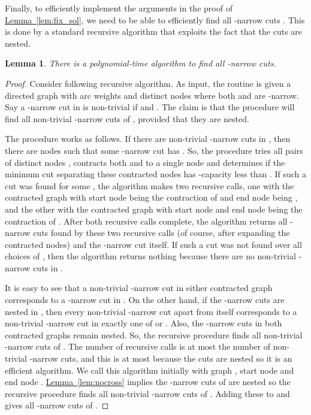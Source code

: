 \documentclass[11pt]{article}
\newcommand{\lref}[2][]{\hyperref[#2]{#1~\ref*{#2}}}
\newtheorem{lemma}[theorem]{Lemma}
\theoremstyle{definition}
\begin{document}
Finally, to efficiently implement the arguments in the proof of \lref[Lemma]{lem:fix_sol}, we need to be able to efficiently find
all -narrow cuts .
This is done by a standard recursive algorithm that exploits the fact that the cuts are nested.
\begin{lemma} \label{lem:efficient}
There is a polynomial-time algorithm to find all -narrow  cuts.
\end{lemma}
\begin{proof}
Consider following recursive algorithm.
As input, the routine is given a directed graph  with arc weights 
and distinct nodes   where both  and  are -narrow.
Say a -narrow cut  in  is non-trivial if  and .
The claim is that the procedure will find all non-trivial -narrow  cuts of , provided that they are nested.

The procedure works as follows.
If there are non-trivial -narrow  cuts in ,
then there are nodes  such that
some -narrow  cut  has .
So, the procedure tries all  pairs of distinct nodes , contracts both  and 
to a single node and determines if the minimum cut separating these contracted nodes
has -capacity less than . If such a cut  was found for some , the algorithm makes two recursive calls,
one with the contracted graph  with start node being the contraction of  and end node being ,
and the other with the contracted graph  with start node  and end node being the contraction of .
After both recursive calls complete, the algorithm returns all -narrow
cuts found by these two recursive calls (of course, after expanding the contracted nodes)
and the -narrow cut  itself. If such a cut  was not found over all choices of , then the algorithm returns
nothing because there are no non-trivial -narrow  cuts in .

It is easy to see that a non-trivial -narrow cut in either contracted graph corresponds to a -narrow cut in .
On the other hand, if the -narrow  cuts are nested in , then every non-trivial -narrow 
cut apart from  itself corresponds to a non-trivial -narrow cut in exactly one of  or
. Also, the -narrow cuts in both contracted graphs remain nested.
So, the recursive procedure finds all non-trivial -narrow cuts of . The number of recursive calls
is at most the number of non-trivial -narrow cuts, and this is at most  because the cuts are nested
so it is an efficient algorithm. We call this algorithm initially with graph , start node  and end node .
\lref[Lemma]{lem:nocross} implies the -narrow  cuts of  are nested
so the recursive procedure finds all non-trivial -narrow cuts of . Adding these to
 and  gives all -narrow cuts of .
\end{proof}
\end{document}
